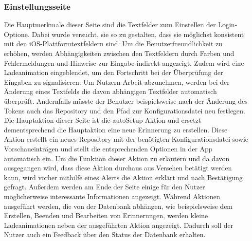 \subsubsection{Einstellungsseite}%
Die Hauptmerkmale dieser Seite sind die Textfelder zum Einstellen der Login-Optione. %
	Dabei wurde versucht, sie so zu gestalten, dass sie möglichst konsistent mit den iOS-Plattformtextfeldern sind.\newline%
Um die Benutzerfreundlichkeit zu erhöhen, werden Abhängigkeiten zwischen den Textfeldern durch Farben und Fehlermeldungen und Hinweise zur Eingabe indirekt angezeigt. Zudem wird eine Ladeanimation eingeblendet, um den Fortschritt bei der Überprüfung der Eingaben zu signalisieren.
Um Nutzern Arbeit abzunehmen, werden bei der Änderung eines Textfelds die davon abhängigen Textfelder automatisch überprüft. Andernfalls müsste der Benutzer beispielsweise nach der Änderung des Tokens auch das Repository und den Pfad zur Konfigurationsdatei neu festlegen.\newline%
Die Hauptaktion dieser Seite ist die \glqq autoSetup-Aktion\grqq{} und ersetzt dementsprechend die Hauptaktion eine neue Erinnerung zu erstellen. Diese Aktion erstellt ein neues Repository mit der benötigten Konfigurationsdatei sowie Vorschaueinträgen und stellt die entsprechenden Optionen in der App automatisch ein. Um die Funktion dieser Aktion zu erläutern und da davon ausgegangen wird, dass diese Aktion durchaus aus Versehen betätigt werden kann, wird vorher mithilfe eines \glqq Alerts\grqq{} die Aktion erklärt und nach Bestätigung gefragt.\newline%
Außerdem werden am Ende der Seite einige für den Nutzer möglicherweise interessante Informationen angezeigt.\newline%
Während Aktionen ausgeführt werden, die von der Datenbank abhängen, wie beispielsweise dem Erstellen, Beenden und Bearbeiten von Erinnerungen, werden kleine Ladeanimationen neben der ausgeführten Aktion angezeigt. Dadurch soll der Nutzer auch ein Feedback über den Status der Datenbank erhalten.
